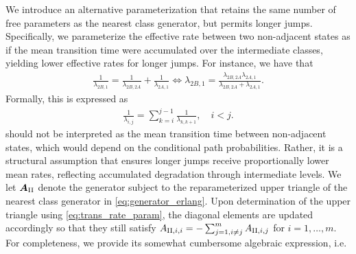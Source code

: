 We introduce an alternative parameterization that retains the same number of free parameters as the nearest class generator, but permits longer jumps. %
Specifically, we parameterize the effective rate between two non-adjacent states as if the mean transition time were accumulated over the intermediate classes, yielding lower effective rates for longer jumps.
For instance, we have that
\begin{align*}
    \frac{1}{\lambda_{2B, 1}} = \frac{1}{\lambda_{2B, 2A}} + \frac{1}{\lambda_{2A, 1}}
    \iff \lambda_{2B,1} = \frac{\lambda_{2B, 2A} \lambda_{2A, 1}}{\lambda_{2B, 2A} + \lambda_{2A, 1}}. 
\end{align*}
Formally, this is expressed as
\begin{align}
    \frac{1}{\lambda_{i,j}} = \sum_{k = i}^{j-1} \frac{1}{\lambda_{k,k+1}}, \quad i < j. \label{eq:trans_rate_param}
\end{align}
 should not be interpreted as the mean transition time between non-adjacent states, which would depend on the conditional path probabilities. Rather, it is a structural assumption that ensures longer jumps receive proportionally lower mean rates, reflecting accumulated degradation through intermediate levels.
We let $\bm{A}_{\RN{2}}$ denote the generator subject to the reparameterized upper triangle of the nearest class generator in \cref{eq:generator_erlang}.
Upon determination of the upper triangle using \cref{eq:trans_rate_param}, the diagonal elements are updated accordingly so that they still satisfy $A_{\RN{2},i,i}= -\sum_{j=1, i \neq j}^m A_{\RN{2},i,j}$ for $i = 1, \dots, m$. For completeness, we provide its somewhat cumbersome algebraic expression, i.e.
